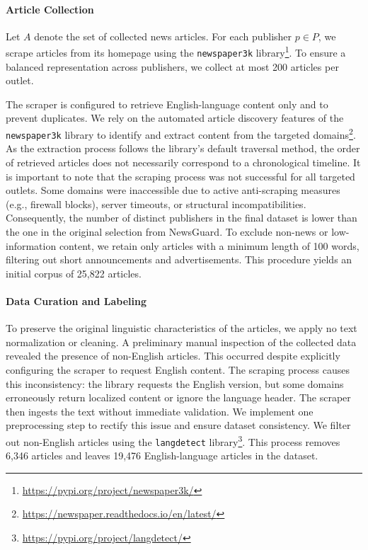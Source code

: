 \documentclass[journal]{IEEEtran}
\begin{document}
\paragraph{Article Collection}
\label{sec:dataCollection}

Let \(A\) denote the set of collected news articles.
For each publisher \(p \in P\), we scrape articles from its homepage using the \texttt{newspaper3k} library\footnote{\url{https://pypi.org/project/newspaper3k/}}.  
To ensure a balanced representation across publishers, we collect at most 200 articles per outlet.

The scraper is configured to retrieve English-language content only and to prevent duplicates. We rely on the automated article discovery features of the \texttt{newspaper3k} library to identify and extract content from the targeted domains\footnote{\url{https://newspaper.readthedocs.io/en/latest/}}.
As the extraction process follows the library's default traversal method, the order of retrieved articles does not necessarily correspond to a chronological timeline.
It is important to note that the scraping process was not successful for all targeted outlets. Some domains were inaccessible due to active anti-scraping measures (e.g., firewall blocks), server timeouts, or structural incompatibilities. Consequently, the number of distinct publishers in the final dataset is lower than the one in the original selection from NewsGuard.
To exclude non-news or low-information content, we retain only articles with a minimum length of 100 words, filtering out short announcements and advertisements. This procedure yields an initial corpus of 25,822 articles.

\paragraph{Data Curation and Labeling}
\label{sec:datacleaning}

To preserve the original linguistic characteristics of the articles, we apply no text normalization or cleaning.
A preliminary manual inspection of the collected data revealed the presence of non-English articles. This occurred despite explicitly configuring the scraper to request English content. The scraping process causes this inconsistency: the library requests the English version, but some domains erroneously return localized content or ignore the language header. The scraper then ingests the text without immediate validation.
We implement one preprocessing step to rectify this issue and ensure dataset consistency. We filter out non-English articles using the \texttt{langdetect} library\footnote{\url{https://pypi.org/project/langdetect/}}. This process removes 6,346 articles and leaves 19,476 English-language articles in the dataset.
\end{document}
